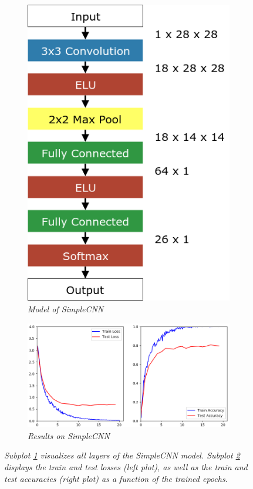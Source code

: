\documentclass[a4paper]{article}
\begin{document}
\begin{figure}
    \centering
    \begin{subfigure}[b]{0.2\textwidth}
        \includegraphics[height=0.25\paperwidth]{graphics/nets/SimpleCNN}
        \caption{\textit{Model of SimpleCNN}}
        \label{fig:simpleCNN_model}
    \end{subfigure}
    \qquad
    \qquad
    \begin{subfigure}[b]{0.6\textwidth}
        \includegraphics[height=0.25\paperwidth]{graphics/nets/SimpleCNN_Results}
        \caption{\textit{Results on SimpleCNN}}
        \label{fig:simpleCNN_results}
    \end{subfigure}
    \caption{\textit{Subplot \ref{fig:simpleCNN_model} visualizes all layers of the SimpleCNN model. Subplot \ref{fig:simpleCNN_results} displays the train and test losses (left plot), as well as the train and test accuracies (right plot) as a function of the trained epochs.}}\label{fig:simpleCNN}
\end{figure}
\end{document}
